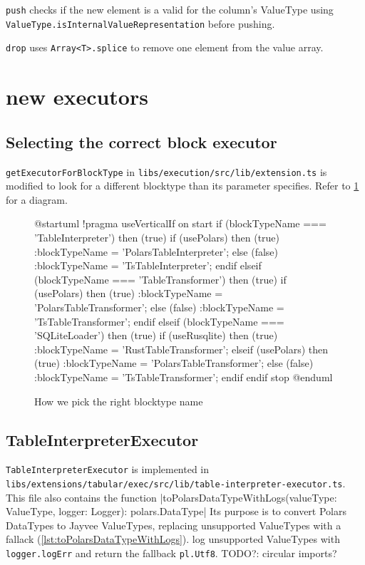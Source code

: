 \Verb|push| checks if the new element is a valid for the column's ValueType using \Verb|ValueType.isInternalValueRepresentation| before pushing.

\Verb|drop| uses \Verb|Array<T>.splice| to remove one element from the value array.


\section{new executors} %
\subsection{Selecting the correct block executor} %
\label{subsection:createBlockExecutor}
\Verb|getExecutorForBlockType| in \Verb|libs/execution/src/lib/extension.ts| is modified to look for a different blocktype than its parameter specifies.
Refer to \ref{fig:uml:getExecutorForBlockType} for a diagram. %
\begin{figure}
	\begin{plantuml}
		@startuml
		!pragma useVerticalIf on
		start
		if (blockTypeName === 'TableInterpreter') then (true)
		if (usePolars) then (true)
		:blockTypeName = 'PolarsTableInterpreter';
		else (false)
		:blockTypeName = 'TsTableInterpreter';
		endif
		elseif (blockTypeName === 'TableTransformer') then (true)
		if (usePolars) then (true)
		:blockTypeName = 'PolarsTableTransformer';
		else (false)
		:blockTypeName = 'TsTableTransformer';
		endif
		elseif (blockTypeName === 'SQLiteLoader') then (true)
		if (useRusqlite) then (true)
		:blockTypeName = 'RustTableTransformer';
		elseif (usePolars) then (true)
		:blockTypeName = 'PolarsTableTransformer';
		else (false)
		:blockTypeName = 'TsTableTransformer';
		endif
		endif
		stop
		@enduml
	\end{plantuml}
	\caption{How we pick the right blocktype name}
	\label{fig:uml:getExecutorForBlockType}
\end{figure}


\subsection{TableInterpreterExecutor} %
\label{section:tableinterpreterexecutor}

\Verb|TableInterpreterExecutor| is implemented in \Verb|libs/extensions/tabular/exec/src/lib/table-interpreter-executor.ts|.
This file also contains the function
|toPolarsDataTypeWithLogs(valueType: ValueType, logger: Logger): polars.DataType|
Its purpose is to convert Polars DataTypes to Jayvee ValueTypes, replacing unsupported ValueTypes with a fallack (\ref{lst:toPolarsDataTypeWithLogs}).
log unsupported ValueTypes with \Verb|logger.logErr| and return the fallback \Verb|pl.Utf8|.
TODO?: circular imports?

